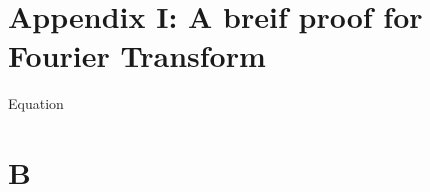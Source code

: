 % 
% 
\appendix
% 
\section{Appendix I: A breif proof for Fourier Transform}\label{sec:Fourier}
% 
Equation
\section{B}